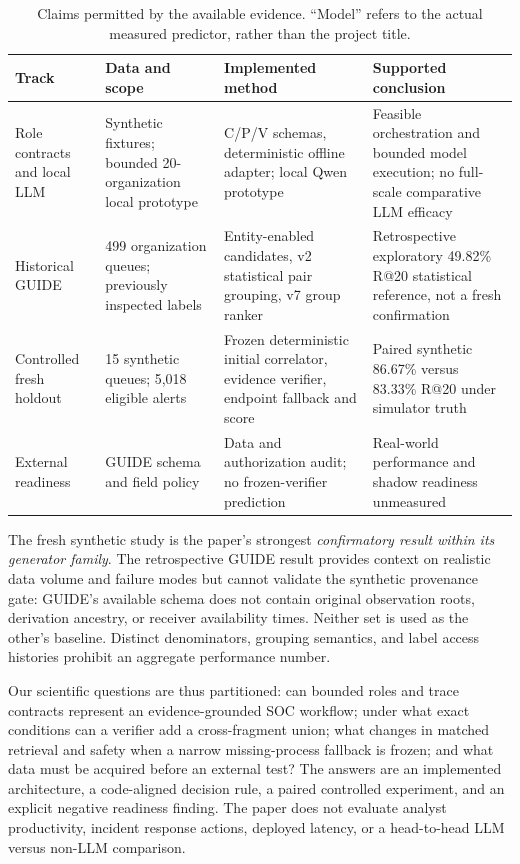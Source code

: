 \begin{table}[t]\centering\footnotesize\caption{Claims permitted by the available evidence. ``Model'' refers to the actual measured predictor, rather than the project title.}\label{tab:scope}
\begin{tabularx}{\textwidth}{@{}p{}p{}p{}Y@{}}\toprule
Track & Data and scope & Implemented method & Supported conclusion\\\midrule
Role contracts and local LLM & Synthetic fixtures; bounded 20-organization local prototype & C/P/V schemas, deterministic offline adapter; local Qwen prototype & Feasible orchestration and bounded model execution; no full-scale comparative LLM efficacy\\
Historical GUIDE & 499 organization queues; previously inspected labels & Entity-enabled candidates, v2 statistical pair grouping, v7 group ranker & Retrospective exploratory 49.82\% R@20 statistical reference, not a fresh confirmation\\
Controlled fresh holdout & 15 synthetic queues; 5,018 eligible alerts & Frozen deterministic initial correlator, evidence verifier, endpoint fallback and score & Paired synthetic 86.67\% versus 83.33\% R@20 under simulator truth\\
External readiness & GUIDE schema and field policy & Data and authorization audit; no frozen-verifier prediction & Real-world performance and shadow readiness unmeasured\\\bottomrule
\end{tabularx}\end{table}

The fresh synthetic study is the paper's strongest \emph{confirmatory result within its generator family}. The retrospective GUIDE result provides context on realistic data volume and failure modes but cannot validate the synthetic provenance gate: GUIDE's available schema does not contain original observation roots, derivation ancestry, or receiver availability times. Neither set is used as the other's baseline. Distinct denominators, grouping semantics, and label access histories prohibit an aggregate performance number.

Our scientific questions are thus partitioned: can bounded roles and trace contracts represent an evidence-grounded SOC workflow; under what exact conditions can a verifier add a cross-fragment union; what changes in matched retrieval and safety when a narrow missing-process fallback is frozen; and what data must be acquired before an external test? The answers are an implemented architecture, a code-aligned decision rule, a paired controlled experiment, and an explicit negative readiness finding. The paper does not evaluate analyst productivity, incident response actions, deployed latency, or a head-to-head LLM versus non-LLM comparison.
